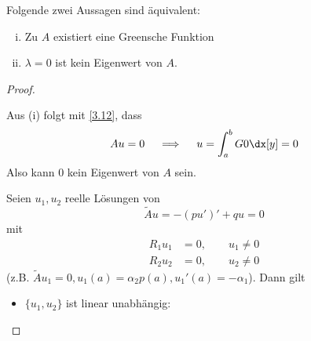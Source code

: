 \begin{st} \label{3.14}
	Folgende zwei Aussagen sind äquivalent:
	\begin{enumerate}[(i)]
		\item
			Zu $A$ existiert eine Greensche Funktion
		\item
			$\lambda = 0$ ist kein Eigenwert von $A$.
	\end{enumerate}
	\begin{proof}
		\begin{seg}[(i)$\implies$(ii)]
			Aus (i) folgt mit \ref{3.12}, dass
			\[
				Au = 0 \quad\implies\quad u = \int_a^b G 0 \dx[y] = 0
			\]
			Also kann $0$ kein Eigenwert von $A$ sein.
		\end{seg}
		\begin{seg}[(ii)$\implies$(i)]
			Seien $u_1,u_2$ reelle Lösungen von 
			\[
				\tilde A u = -(pu')' + qu = 0
			\]
			mit
			\begin{align*}
				R_1u_1 &= 0, \qquad u_1 \neq 0 \\
				R_2u_2 &= 0, \qquad u_2 \neq 0
			\end{align*}
			(z.B. $\tilde A u_1 = 0, u_1(a) = \alpha_2 p(a), u_1'(a) = - \alpha_1$).
			Dann gilt
			\begin{itemize}
				\item
					$\{u_1,u_2\}$ ist linear unabhängig:


\end{itemize}
\end{seg}
\end{proof}
\end{st}
